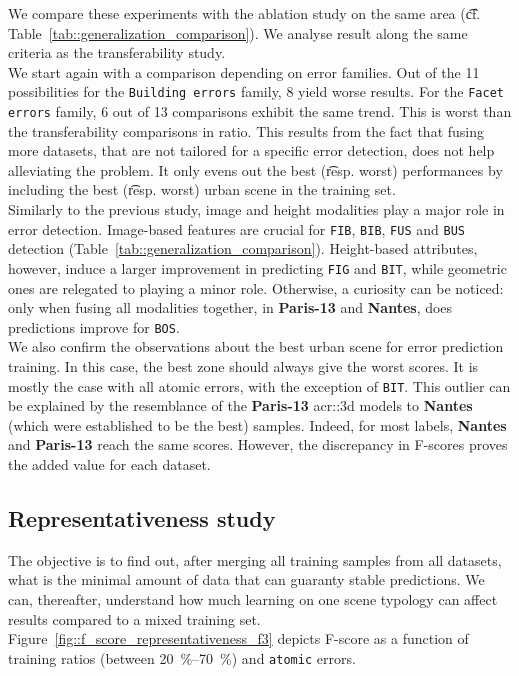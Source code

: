         We compare these experiments with the ablation study on the same area (\t{cf.} Table~\ref{tab::generalization_comparison}).
        We analyse result along the same criteria as the transferability study.\\
    
        We start again with a comparison depending on error families.
        Out of the 11 possibilities for the \texttt{Building errors} family, 8 yield worse results.
        For the \texttt{Facet errors} family, 6 out of 13 comparisons exhibit the same trend.
        This is worst than the transferability comparisons in ratio.
        This results from the fact that fusing more datasets, that are not tailored for a specific error detection, does not help alleviating the problem.
        It only evens out the best (\t{resp.} worst) performances by including the best (\t{resp.} worst) urban scene in the training set.\\
        
        Similarly to the previous study, image and height modalities play a major role in error detection.
        Image-based features are crucial for \texttt{FIB}, \texttt{BIB}, \texttt{FUS} and \texttt{BUS} detection (Table~\ref{tab::generalization_comparison}).
        Height-based attributes, however, induce a larger improvement in predicting \texttt{FIG} and \texttt{BIT}, while geometric ones are relegated to playing a minor role.
        Otherwise, a curiosity can be noticed: only when fusing all modalities together, in \textbf{Paris-13} and \textbf{Nantes}, does predictions improve for \texttt{BOS}.\\
        
        We also confirm the observations about the best urban scene for error prediction training.
        In this case, the best zone should always give the worst scores.
        It is mostly the case with all atomic errors, with the exception of \texttt{BIT}.
        This outlier can be explained by the resemblance of the \textbf{Paris-13} \gls{acr::3d} models to \textbf{Nantes} (which were established to be the best) samples.
        Indeed, for most labels, \textbf{Nantes} and \textbf{Paris-13} reach the same scores.
        However, the discrepancy in F-scores proves the added value for each dataset.
    
    \subsection{Representativeness study}
        \label{subsec::more_experiments::scalability::representativeness}
        The objective is to find out, after merging all training samples from all datasets, what is the minimal amount of data that can guaranty stable predictions.
        We can, thereafter, understand how much learning on one scene typology can affect results compared to a mixed training set.
        Figure~\ref{fig::f_score_representativeness_f3} depicts F-score as a function of training ratios (between \SIrange[range-phrase={ and }]{20}{70}{\percent}) and \texttt{atomic} errors.\\
                
